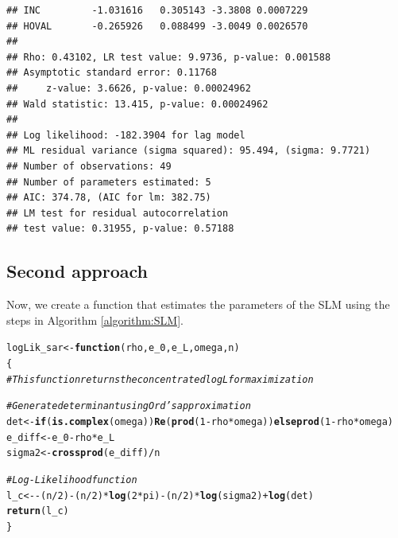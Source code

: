 \documentclass[english,12pt]{book}\usepackage[]{graphicx}\usepackage[]{xcolor}
\makeatletter
\newcommand{\hlnum}[1]{\textcolor[rgb]{0.686,0.059,0.569}{#1}}%
\newcommand{\hlcom}[1]{\textcolor[rgb]{0.678,0.584,0.686}{\textit{#1}}}%
\newcommand{\hlopt}[1]{\textcolor[rgb]{0,0,0}{#1}}%
\newcommand{\hlstd}[1]{\textcolor[rgb]{0.345,0.345,0.345}{#1}}%
\newcommand{\hlkwa}[1]{\textcolor[rgb]{0.161,0.373,0.58}{\textbf{#1}}}%
\newcommand{\hlkwb}[1]{\textcolor[rgb]{0.69,0.353,0.396}{#1}}%
\newcommand{\hlkwc}[1]{\textcolor[rgb]{0.333,0.667,0.333}{#1}}%
\newcommand{\hlkwd}[1]{\textcolor[rgb]{0.737,0.353,0.396}{\textbf{#1}}}%
\newenvironment{kframe}{%
 \def\at@end@of@kframe{}%
 \ifinner\ifhmode%
  \def\at@end@of@kframe{\end{minipage}}%
  \begin{minipage}{\columnwidth}%
 \fi\fi%
 \def\FrameCommand##1{\hskip\@totalleftmargin \hskip-\fboxsep
 \colorbox{shadecolor}{##1}\hskip-\fboxsep
     \hskip-\linewidth \hskip-\@totalleftmargin \hskip\columnwidth}%
 \MakeFramed {\advance\hsize-\width
   \@totalleftmargin\z@ \linewidth\hsize
   \@setminipage}}%
 {\par\unskip\endMakeFramed%
 \at@end@of@kframe}
\newenvironment{knitrout}{}{} %
\makeatother
\begin{document}
\begin{knitrout}
\begin{kframe}
\begin{verbatim}
## INC         -1.031616   0.305143 -3.3808 0.0007229
## HOVAL       -0.265926   0.088499 -3.0049 0.0026570
## 
## Rho: 0.43102, LR test value: 9.9736, p-value: 0.001588
## Asymptotic standard error: 0.11768
##     z-value: 3.6626, p-value: 0.00024962
## Wald statistic: 13.415, p-value: 0.00024962
## 
## Log likelihood: -182.3904 for lag model
## ML residual variance (sigma squared): 95.494, (sigma: 9.7721)
## Number of observations: 49 
## Number of parameters estimated: 5 
## AIC: 374.78, (AIC for lm: 382.75)
## LM test for residual autocorrelation
## test value: 0.31955, p-value: 0.57188
\end{verbatim}
\end{kframe}
\end{knitrout}

\subsection{Second approach}\label{sec:code-condentrated-slm}

Now, we create a function that estimates the parameters of the SLM using the steps in  Algorithm \eqref{algorithm:SLM}.

\begin{knitrout}
\color{fgcolor}\begin{kframe}
\begin{alltt}
\hlstd{logLik_sar} \hlkwb{<-} \hlkwa{function}\hlstd{(}\hlkwc{rho}\hlstd{,} \hlkwc{e_0}\hlstd{,} \hlkwc{e_L}\hlstd{,} \hlkwc{omega}\hlstd{,} \hlkwc{n}\hlstd{)}
\hlstd{\{}
  \hlcom{# This function returns the concentrated log L for maximization}

  \hlcom{#Generate determinant using Ord's approximation}
  \hlstd{det}    \hlkwb{<-} \hlkwa{if} \hlstd{(}\hlkwd{is.complex}\hlstd{(omega))} \hlkwd{Re}\hlstd{(}\hlkwd{prod}\hlstd{(}\hlnum{1} \hlopt{-} \hlstd{rho} \hlopt{*} \hlstd{omega))} \hlkwa{else} \hlkwd{prod}\hlstd{(}\hlnum{1} \hlopt{-} \hlstd{rho} \hlopt{*} \hlstd{omega)}
  \hlstd{e_diff} \hlkwb{<-} \hlstd{e_0} \hlopt{-} \hlstd{rho} \hlopt{*} \hlstd{e_L}
  \hlstd{sigma2} \hlkwb{<-} \hlkwd{crossprod}\hlstd{(e_diff)} \hlopt{/} \hlstd{n}

  \hlcom{#Log-Likelihood function}
  \hlstd{l_c}    \hlkwb{<-} \hlopt{-} \hlstd{(n} \hlopt{/} \hlnum{2}\hlstd{)} \hlopt{-} \hlstd{(n} \hlopt{/} \hlnum{2}\hlstd{)} \hlopt{*} \hlkwd{log}\hlstd{(}\hlnum{2} \hlopt{*} \hlstd{pi)} \hlopt{-} \hlstd{(n} \hlopt{/} \hlnum{2}\hlstd{)} \hlopt{*} \hlkwd{log}\hlstd{(sigma2)} \hlopt{+} \hlkwd{log}\hlstd{(det)}
  \hlkwd{return}\hlstd{(l_c)}
\hlstd{\}}
\end{alltt}
\end{kframe}
\end{knitrout}
\end{document}
